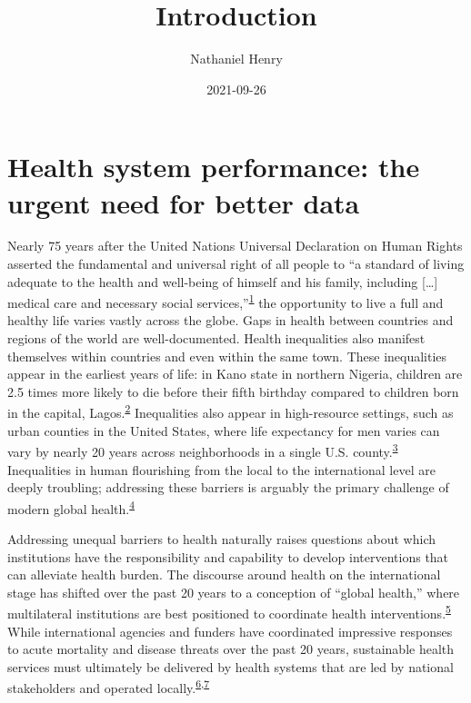 \documentclass[
]{article}
\title{Introduction}
\author{Nathaniel Henry\textsuperscript{}}
\date{2021-09-26}
\begin{document}
\maketitle

\hypertarget{health-system-performance-the-urgent-need-for-better-data}{%
\section{Health system performance: the urgent need for better data}\label{health-system-performance-the-urgent-need-for-better-data}}

Nearly 75 years after the United Nations Universal Declaration on Human Rights asserted the fundamental and universal right of all people to ``a standard of living adequate to the health and well-being of himself and his family, including {[}\ldots{]} medical care and necessary social services,''\textsuperscript{\protect\hyperlink{ref-srs}{1}} the opportunity to live a full and healthy life varies vastly across the globe. Gaps in health between countries and regions of the world are well-documented. Health inequalities also manifest themselves within countries and even within the same town. These inequalities appear in the earliest years of life: in Kano state in northern Nigeria, children are 2.5 times more likely to die before their fifth birthday compared to children born in the capital, Lagos.\textsuperscript{\protect\hyperlink{ref-Burstein2019}{2}} Inequalities also appear in high-resource settings, such as urban counties in the United States, where life expectancy for men varies can vary by nearly 20 years across neighborhoods in a single U.S. county.\textsuperscript{\protect\hyperlink{ref-Dwyer-Lindgren2017}{3}} Inequalities in human flourishing from the local to the international level are deeply troubling; addressing these barriers is arguably the primary challenge of modern global health.\textsuperscript{\protect\hyperlink{ref-Ruger2006}{4}}

Addressing unequal barriers to health naturally raises questions about which institutions have the responsibility and capability to develop interventions that can alleviate health burden. The discourse around health on the international stage has shifted over the past 20 years to a conception of ``global health,'' where multilateral institutions are best positioned to coordinate health interventions.\textsuperscript{\protect\hyperlink{ref-Brown2006}{5}} While international agencies and funders have coordinated impressive responses to acute mortality and disease threats over the past 20 years, sustainable health services must ultimately be delivered by health systems that are led by national stakeholders and operated locally.\textsuperscript{\protect\hyperlink{ref-WorldHealthOrganization2007}{6},\protect\hyperlink{ref-WorldHealthOrganization2010}{7}}
\end{document}
